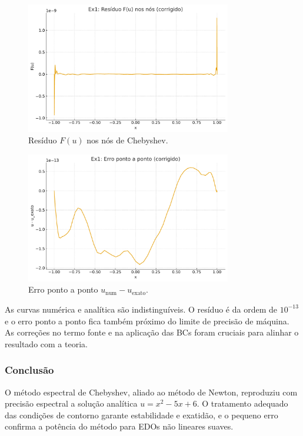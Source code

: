 \documentclass[12pt,a4paper]{article}
\begin{document}
\begin{figure}[h!]
\centering
\includegraphics[width=0.8\textwidth]{figures/ex1c_residual.pdf}
\caption{Resíduo \(F(u)\) nos nós de Chebyshev.}
\end{figure}

\begin{figure}[h!]
\centering
\includegraphics[width=0.8\textwidth]{figures/ex1c_pointwise_error.pdf}
\caption{Erro ponto a ponto \(u_{\text{num}}-u_{\text{exato}}\).}
\end{figure}

As curvas numérica e analítica são indistinguíveis.  
O resíduo é da ordem de \(10^{-13}\) e o erro ponto a ponto fica também próximo do limite de precisão de máquina.  
As correções no termo fonte e na aplicação das BCs foram cruciais para alinhar o resultado com a teoria.

\subsubsection*{Conclusão}
O método espectral de Chebyshev, aliado ao método de Newton, reproduziu com precisão espectral a solução analítica \(u=x^2-5x+6\).  
O tratamento adequado das condições de contorno garante estabilidade e exatidão, e o pequeno erro confirma a potência do método para EDOs não lineares suaves.
\end{document}
